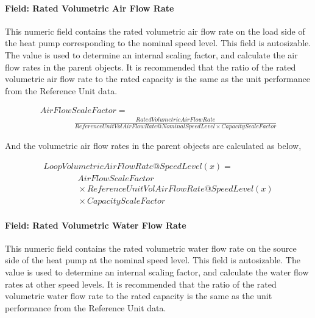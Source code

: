 \paragraph{Field: Rated Volumetric Air Flow Rate}\label{field-rated-volumetric-air-flow-rate-2}

This numeric field contains the rated volumetric air flow rate on the load side of the heat pump corresponding to the nominal speed level. This field is autosizable. The value is used to determine an internal scaling factor, and calculate the air flow rates in the parent objects. It is recommended that the ratio of the rated volumetric air flow rate to the rated capacity is the same as the unit performance from the Reference Unit data.

\begin{equation}
  \begin{array}{l}
    AirFlowScaleFactor = \\
    \quad \quad \quad \quad \frac{{RatedVolumetricAirFlowRate}}{{ReferenceUnitVolAirFlowRate@NominalSpeedLevel \times CapacityScaleFactor}}
  \end{array}
\end{equation}

And the volumetric air flow rates in the parent objects are calculated as below,

\begin{equation}
  \begin{array}{l}
    LoopVolumetricAirFlowRate@SpeedLevel\left( x \right) = \\
    \quad \quad \quad \quad AirFlowScaleFactor \\
    \quad \quad \quad \quad  \times ReferenceUnitVolAirFlowRate@SpeedLevel(x) \\
    \quad \quad \quad \quad  \times CapacityScaleFactor
  \end{array}
\end{equation}

\paragraph{Field: Rated Volumetric Water Flow Rate}\label{field-rated-volumetric-water-flow-rate-1}

This numeric field contains the rated volumetric water flow rate on the source side of the heat pump at the nominal speed level. This field is autosizable. The value is used to determine an internal scaling factor, and calculate the water flow rates at other speed levels. It is recommended that the ratio of the rated volumetric water flow rate to the rated capacity is the same as the unit performance from the Reference Unit data.

